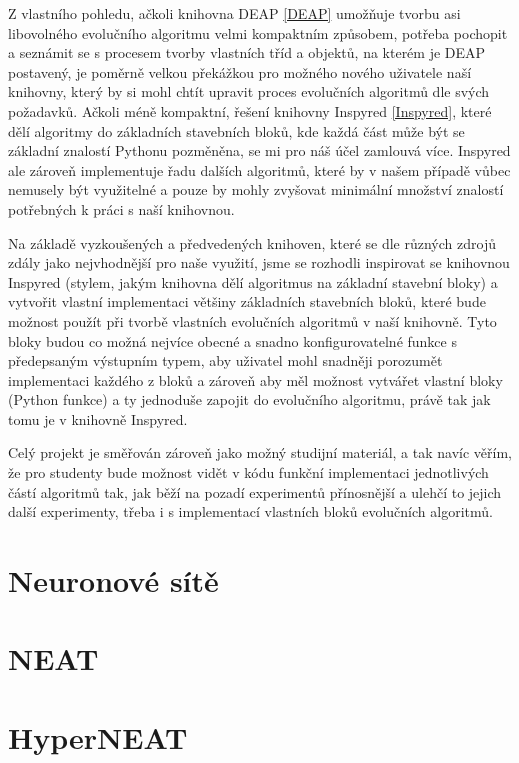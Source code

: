 Z vlastního pohledu, ačkoli knihovna DEAP \ref{DEAP} umožňuje tvorbu asi
libovolného evolučního algoritmu velmi kompaktním způsobem, potřeba pochopit a
seznámit se s procesem tvorby vlastních tříd a objektů, na kterém je DEAP
postavený, je poměrně velkou překážkou pro možného nového uživatele naší
knihovny, který by si mohl chtít upravit proces evolučních algoritmů dle
svých požadavků. Ačkoli méně kompaktní, řešení knihovny Inspyred
\ref{Inspyred}, které dělí algoritmy do základních stavebních bloků, kde každá
část může být se základní znalostí Pythonu pozměněna, se mi pro náš účel
zamlouvá více. Inspyred ale zároveň implementuje řadu dalších algoritmů, které
by v našem případě vůbec nemusely být využitelné a pouze by mohly zvyšovat
minimální množství znalostí potřebných k práci s naší knihovnou.

Na základě vyzkoušených a předvedených knihoven, které se dle různých zdrojů
\citep{fortin2012deap} zdály jako nejvhodnější pro naše využití, jsme se
rozhodli inspirovat se knihovnou Inspyred (stylem, jakým knihovna dělí
algoritmus na základní stavební bloky) a vytvořit vlastní implementaci většiny
základních stavebních bloků, které bude možnost použít při tvorbě vlastních
evolučních algoritmů v naší knihovně. Tyto bloky budou co možná nejvíce obecné
a snadno konfigurovatelné funkce s předepsaným výstupním typem, aby uživatel
mohl snadněji porozumět implementaci každého z bloků a zároveň aby měl možnost
vytvářet vlastní bloky (Python funkce) a ty jednoduše zapojit do evolučního
algoritmu, právě tak jak tomu je v knihovně Inspyred. 

Celý projekt je směřován zároveň jako možný studijní materiál, a tak navíc
věřím, že pro studenty bude možnost vidět v kódu funkční implementaci
jednotlivých částí algoritmů tak, jak běží na pozadí experimentů přínosnější a
ulehčí to jejich další experimenty, třeba i s implementací vlastních bloků
evolučních algoritmů.

\section{Neuronové sítě} \label{NN}
\section{NEAT} \label{NN - NEAT}
\section{HyperNEAT} \label{NN - HyperNEAT}

